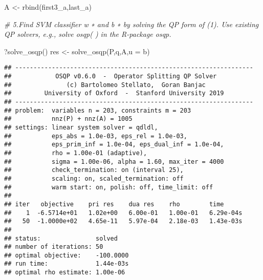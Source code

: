 \documentclass[
]{article}
\newenvironment{Shaded}{\begin{snugshade}}{\end{snugshade}}
\newcommand{\AttributeTok}[1]{\textcolor[rgb]{0.77,0.63,0.00}{#1}}
\newcommand{\CommentTok}[1]{\textcolor[rgb]{0.56,0.35,0.01}{\textit{#1}}}
\newcommand{\FunctionTok}[1]{\textcolor[rgb]{0.00,0.00,0.00}{#1}}
\newcommand{\NormalTok}[1]{#1}
\newcommand{\OtherTok}[1]{\textcolor[rgb]{0.56,0.35,0.01}{#1}}
\newcommand{\SpecialCharTok}[1]{\textcolor[rgb]{0.00,0.00,0.00}{#1}}
\begin{document}
\begin{Shaded}
\begin{Highlighting}[]
\NormalTok{A }\OtherTok{\textless{}{-}} \FunctionTok{rbind}\NormalTok{(first3\_a,last\_a)}

\CommentTok{\# 5.Find SVM classiﬁer w ∗ and b ∗ by solving the QP form of (1). Use existing QP solvers, e.g., solve osqp( ) in the R{-}package osqp.}

\NormalTok{?}\FunctionTok{solve\_osqp}\NormalTok{()}
\NormalTok{res }\OtherTok{\textless{}{-}} \FunctionTok{solve\_osqp}\NormalTok{(P,q,A,}\AttributeTok{u =}\NormalTok{ b)}
\end{Highlighting}
\end{Shaded}

\begin{verbatim}
## -----------------------------------------------------------------
##            OSQP v0.6.0  -  Operator Splitting QP Solver
##               (c) Bartolomeo Stellato,  Goran Banjac
##         University of Oxford  -  Stanford University 2019
## -----------------------------------------------------------------
## problem:  variables n = 203, constraints m = 203
##           nnz(P) + nnz(A) = 1005
## settings: linear system solver = qdldl,
##           eps_abs = 1.0e-03, eps_rel = 1.0e-03,
##           eps_prim_inf = 1.0e-04, eps_dual_inf = 1.0e-04,
##           rho = 1.00e-01 (adaptive),
##           sigma = 1.00e-06, alpha = 1.60, max_iter = 4000
##           check_termination: on (interval 25),
##           scaling: on, scaled_termination: off
##           warm start: on, polish: off, time_limit: off
## 
## iter   objective    pri res    dua res    rho        time
##    1  -6.5714e+01   1.02e+00   6.00e-01   1.00e-01   6.29e-04s
##   50  -1.0000e+02   4.65e-11   5.97e-04   2.18e-03   1.43e-03s
## 
## status:               solved
## number of iterations: 50
## optimal objective:    -100.0000
## run time:             1.44e-03s
## optimal rho estimate: 1.00e-06
\end{verbatim}

\begin{Shaded}
\end{Shaded}
\end{document}
